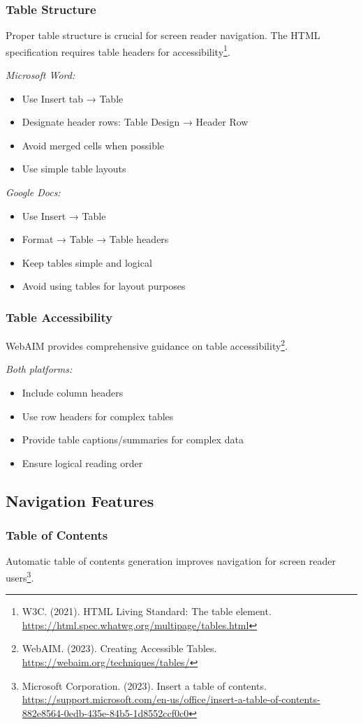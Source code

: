 \subsubsection{Table Structure}
Proper table structure is crucial for screen reader navigation. The HTML specification requires table headers for accessibility\footnote{W3C. (2021). HTML Living Standard: The table element. \url{https://html.spec.whatwg.org/multipage/tables.html}}.

\emph{Microsoft Word:}
\begin{itemize}
\item Use Insert tab → Table
\item Designate header rows: Table Design → Header Row
\item Avoid merged cells when possible
\item Use simple table layouts
\end{itemize}

\emph{Google Docs:}
\begin{itemize}
\item Use Insert → Table
\item Format → Table → Table headers
\item Keep tables simple and logical
\item Avoid using tables for layout purposes
\end{itemize}

\subsubsection{Table Accessibility}
WebAIM provides comprehensive guidance on table accessibility\footnote{WebAIM. (2023). Creating Accessible Tables. \url{https://webaim.org/techniques/tables/}}.

\emph{Both platforms:}
\begin{itemize}
\item Include column headers
\item Use row headers for complex tables
\item Provide table captions/summaries for complex data
\item Ensure logical reading order
\end{itemize}

\subsection{Navigation Features}

\subsubsection{Table of Contents}
Automatic table of contents generation improves navigation for screen reader users\footnote{Microsoft Corporation. (2023). Insert a table of contents. \url{https://support.microsoft.com/en-us/office/insert-a-table-of-contents-882e8564-0edb-435e-84b5-1d8552ccf0c0}}.

